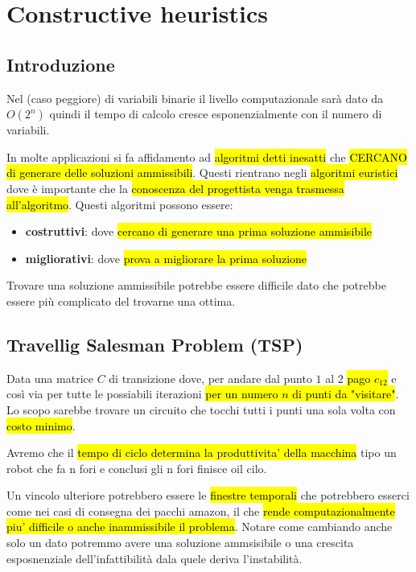 \newpage
\section{Constructive heuristics}

\subsection{Introduzione}
Nel (caso peggiore) di variabili binarie il livello computazionale sarà dato da $O(2^n)$ quindi il tempo di calcolo cresce esponenzialmente con il numero di variabili. 

In molte applicazioni si fa affidamento ad \hl{algoritmi detti inesatti} che \hl{CERCANO di generare delle soluzioni ammissibili}. Questi rientrano negli \hl{algoritmi euristici} dove è importante che la \hl{conoscenza del progettista venga trasmessa all'algoritmo}. Questi algoritmi possono essere:

\begin{itemize}
    \item \textbf{costruttivi}: dove \hl{cercano di generare una prima soluzione ammisibile}
    \item \textbf{migliorativi}: dove \hl{prova a migliorare la prima soluzione}
\end{itemize}

Trovare una soluzione ammissibile potrebbe essere difficile dato che potrebbe essere più complicato del trovarne una ottima.


\subsection{Travellig Salesman Problem (TSP)}

Data una matrice $C$ di transizione dove, per andare dal punto $1$ al $2$ \hl{pago $c_{12}$} e così via per tutte le possiabili iterazioni \hl{per un numero $n$ di punti da "visitare"}. Lo scopo sarebbe trovare un circuito che tocchi tutti i punti una sola volta con \hl{costo minimo}.

Avremo che il \hl{tempo di ciclo determina la produttivita' della macchina} tipo un robot che fa n fori e conclusi gli n fori finisce oil cilo.

Un vincolo ulteriore potrebbero essere le \hl{finestre temporali} che potrebbero esserci come nei casi di consegna dei pacchi amazon, il che \hl{rende computazionalmente piu' difficile o anche inammissibile il problema}. Notare come cambiando anche solo un dato potremmo avere una soluzione ammsisibile o una crescita esposnenziale dell'infattibilità dala quele deriva l'instabilità.


